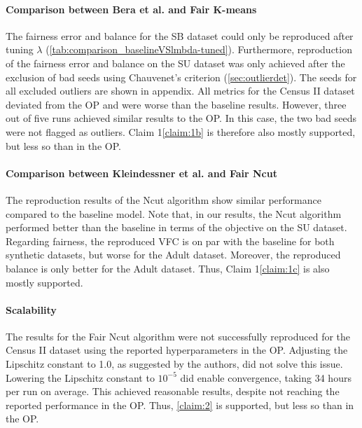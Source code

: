 \paragraph{Comparison between Bera et al. and Fair $\mathbf{K}$-means}\label{ssec:comparisonkmeans} The fairness error and balance for the SB dataset could only be reproduced after tuning $\lambda$ (\autoref{tab:comparison_baselineVSlmbda-tuned}). Furthermore, reproduction of the fairness error and balance on the SU dataset was only achieved after the exclusion of bad seeds using Chauvenet's criterion (\autoref{sec:outlierdet}). The seeds for all excluded outliers are shown in appendix.
All metrics for the Census II dataset deviated from the OP and were worse than the baseline results. However, three out of five runs achieved similar results to the OP. In this case, the two bad seeds were not flagged as outliers.
Claim 1\ref{claim:1b} is therefore also mostly supported, but less so than in the OP.

\paragraph{Comparison between Kleindessner et al. and Fair Ncut} 
The reproduction results of the Ncut algorithm show similar performance compared to the baseline model. Note that, in our results, the Ncut algorithm performed better than the baseline in terms of the objective on the SU dataset. Regarding fairness, the reproduced VFC is on par with the baseline for both synthetic datasets, but worse for the Adult dataset. Moreover, the reproduced balance is only better for the Adult dataset. Thus, Claim 1\ref{claim:1c} is also mostly supported.

\paragraph{Scalability}
The results for the Fair Ncut algorithm were not successfully reproduced for the Census II dataset using the reported hyperparameters in the OP. Adjusting the Lipschitz constant to 1.0, as suggested by the authors, did not solve this issue. Lowering the Lipschitz constant to $10^{-5}$ did enable convergence, taking 34 hours per run on average. This achieved reasonable results, despite not reaching the reported performance in the OP. Thus, \ref{claim:2} is supported, but less so than in the OP.

